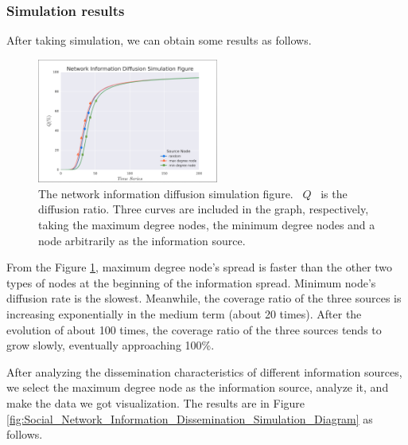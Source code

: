 \documentclass[a4paper,11pt]{article}
\begin{document}
\subsubsection{Simulation results}

\par After taking simulation, we can obtain some results as follows.


\begin{figure}[h]%
    \centering 
    \includegraphics[width=0.53\textwidth]{./Pic/aa_3.jpg}
    \caption{The network information diffusion simulation figure. ~$Q$~ is the diffusion ratio. Three curves are included in the graph, respectively, taking the maximum degree nodes, the minimum degree nodes and a node arbitrarily as the information source.}
    \label{fig:aa_3}  
\end{figure}
\par From the Figure \ref{fig:aa_3}, maximum degree node's spread is faster than the other two types of nodes at the beginning of the information spread. Minimum node's diffusion rate is the slowest. Meanwhile, the coverage ratio of the three sources is increasing exponentially in the medium term (about 20 times). After the evolution of about 100 times, the coverage ratio of the three sources tends to grow slowly, eventually approaching 100\%.
\par After analyzing the dissemination characteristics of different information sources, we select the maximum degree node as the information source, analyze it, and make the data we got visualization. The results are in Figure \ref{fig:Social_Network_Information_Dissemination_Simulation_Diagram} as follows.
\end{document}
